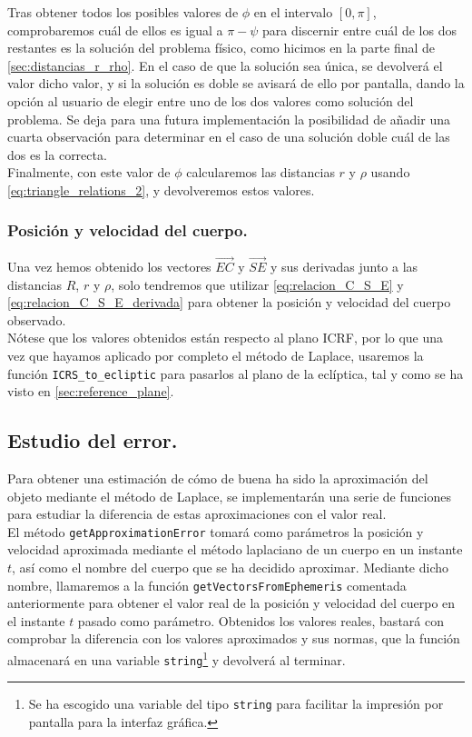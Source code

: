 \documentclass[11pt]{book}
\begin{document}
Tras obtener todos los posibles valores de $\phi$ en el intervalo $[0,\pi]$, comprobaremos cuál de ellos es igual a $\pi-\psi$ para discernir entre cuál de los dos restantes es la solución del problema físico, como hicimos en la parte final de \ref{sec:distancias_r_rho}. En el caso de que la solución sea única, se devolverá el valor dicho valor, y si la solución es doble se avisará de ello por pantalla, dando la opción al usuario de elegir entre uno de los dos valores como solución del problema. Se deja para una futura implementación la posibilidad de añadir una cuarta observación para determinar en el caso de una solución doble cuál de las dos es la correcta.\\

Finalmente, con este valor de $\phi$ calcularemos las distancias $r$ y $\rho$ usando \eqref{eq:triangle_relations_2}, y devolveremos estos valores.\\

\subsubsection{Posición y velocidad del cuerpo.}
Una vez hemos obtenido los vectores $\overrightarrow{EC}$ y $\overrightarrow{SE}$ y sus derivadas junto a las distancias $R$, $r$ y $\rho$, solo tendremos que utilizar \eqref{eq:relacion_C_S_E} y \eqref{eq:relacion_C_S_E_derivada} para obtener la posición y velocidad del cuerpo observado.\\

Nótese que los valores obtenidos están respecto al plano ICRF, por lo que una vez que hayamos aplicado por completo el método de Laplace, usaremos la función \texttt{ICRS\_to\_ecliptic} para pasarlos al plano de la eclíptica, tal y como se ha visto en \ref{sec:reference_plane}.\\

\subsection{Estudio del error.}
Para obtener una estimación de cómo de buena ha sido la aproximación del objeto mediante el método de Laplace, se implementarán una serie de funciones para estudiar la diferencia de estas aproximaciones con el valor real.\\

El método \texttt{getApproximationError} tomará como parámetros la posición y velocidad aproximada mediante el método laplaciano de un cuerpo en un instante $t$, así como el nombre del cuerpo que se ha decidido aproximar. Mediante dicho nombre, llamaremos a la función \texttt{getVectorsFromEphemeris} comentada anteriormente para obtener el valor real de la posición y velocidad del cuerpo en el instante $t$ pasado como parámetro. Obtenidos los valores reales, bastará con comprobar la diferencia con los valores aproximados y sus normas, que la función almacenará en una variable \texttt{string}\footnote{Se ha escogido una variable del tipo \texttt{string} para facilitar la impresión por pantalla para la interfaz gráfica.} y devolverá al terminar.\\
\end{document}
